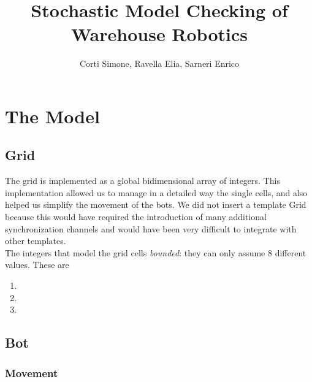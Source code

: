 \documentclass[10pt,a4paper]{article}
\title{Stochastic Model Checking of Warehouse Robotics}
\author{Corti Simone, Ravella Elia, Sarneri Enrico}
\begin{document}
	\begin{titlepage}
		\maketitle
	\end{titlepage}
	
	\section{The Model}
		\subsection{Grid}
			The grid is implemented as a global bidimensional array of integers. This implementation allowed us to manage in a detailed way the single cells, and also helped us simplify the movement of the bots. We did not insert a template Grid because this would have required the introduction of many additional synchronization channels and would have been very difficult to integrate with other templates.\\
			The integers that model the grid cells \emph{bounded}: they can only assume 8 different values. These are
			\begin{enumerate}[start=0, label={\arabic* :}]
				\item 
				\item 
				\item
			\end{enumerate}
		
		\subsection{Bot}
			\subsubsection{Movement}
		
\end{document}
